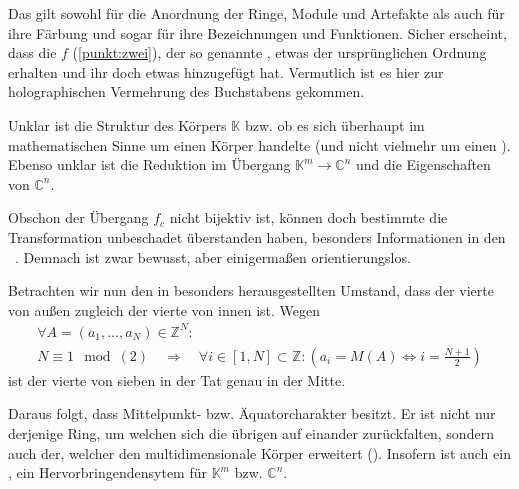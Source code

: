 Das gilt sowohl für die Anordnung der Ringe, Module und Artefakte als auch für ihre Färbung und sogar für ihre Bezeichnungen und Funktionen. Sicher erscheint, dass die   $f$ (\cref{punkt:zwei}), der so genannte , etwas der ursprünglichen Ordnung erhalten und ihr doch etwas hinzugefügt hat. Vermutlich ist es hier zur holographischen Vermehrung des Buchstabens  gekommen.

Unklar ist die Struktur des Körpers $\mathbb{K}$ bzw. ob es sich überhaupt im mathematischen Sinne um einen Körper handelte (und nicht vielmehr um einen ). Ebenso unklar ist die Reduktion im Übergang  $\mathbb{K}^m \rightarrow \mathbb{C}^n$ und die Eigenschaften von $\mathbb{C}^n$. 

Obschon der Übergang  $f_c$ nicht bijektiv ist, können doch bestimmte  die Transformation unbeschadet überstanden haben, besonders Informationen in den ~\cite[S. 28]{cbasebook}. Demnach ist  zwar bewusst, aber einigermaßen orientierungslos.

    Betrachten wir nun den in  besonders herausgestellten Umstand, dass der vierte  von außen zugleich der vierte von innen ist. Wegen
        \begin{multline}
            \forall A = (a_1,\ldots,a_N) \in \mathbb{Z}^N : \\           %
            N\equiv 1\mod(2)
            \quad\Rightarrow\quad
            \forall i \in [1,N] \subset \mathbb{Z}:
            \left(
            a_i = M(A) \Leftrightarrow i = \frac{N+1}{2}
            \right)
        \end{multline}
    ist der vierte  von sieben in der Tat genau in der Mitte.

    Daraus folgt, dass   Mittelpunkt- bzw. Äquatorcharakter besitzt. 
    Er ist nicht nur derjenige Ring, um welchen sich die übrigen  auf einander zurückfalten, sondern auch der, welcher den multidimensionale Körper erweitert (). Insofern ist  auch ein , ein Hervorbringendensytem für $\mathbb{K}^m$ bzw. $\mathbb{C}^n$.


